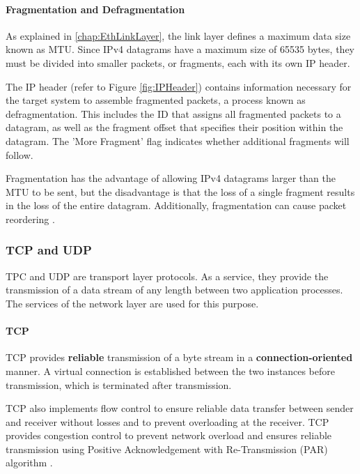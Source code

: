 \paragraph{Fragmentation and Defragmentation} \label{chap:frag}

As explained in \ref{chap:EthLinkLayer}, the link layer defines a maximum data size known as MTU. Since IPv4 datagrams have a maximum size of 65535 bytes, they must be divided into smaller packets, or fragments, each with its own IP header.

The IP header (refer to Figure \ref{fig:IPHeader}) contains information necessary for the target system to assemble fragmented packets, a process known as defragmentation. This includes the ID that assigns all fragmented packets to a datagram, as well as the fragment offset that specifies their position within the datagram. The 'More Fragment' flag indicates whether additional fragments will follow.

Fragmentation has the advantage of allowing IPv4 datagrams larger than the MTU to be sent, but the disadvantage is that the loss of a single fragment results in the loss of the entire datagram. Additionally, fragmentation can cause packet reordering \cite{IPFragDetail}.

\subsubsection{TCP and UDP}
TPC and UDP are transport layer protocols. As a service, they provide the transmission of a data stream of any length between two application processes. The services of the network layer are used for this purpose.

\paragraph{TCP}

TCP provides \textbf{reliable} transmission of a byte stream in a \textbf{connection-oriented} manner. A virtual connection is established between the two instances before transmission, which is terminated after transmission.

TCP also implements flow control to ensure reliable data transfer between sender and receiver without losses and to prevent overloading at the receiver.  TCP provides congestion control to prevent network overload and ensures reliable transmission using Positive Acknowledgement with Re-Transmission (PAR) algorithm \cite{Holtkamp2024Transport}.  

